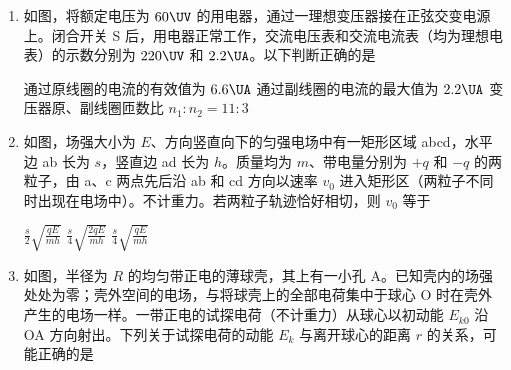 \documentclass[\gkver]{gaokaozhenti}
\begin{document}
\begin{enumerate}

{$F_{N}$ 向左}
{$F_{M}$ 逐渐增大}
{$F_{N}$ 逐渐减小}


\item
如图，将额定电压为 $60\UV$ 的用电器，通过一理想变压器接在正弦交变电源上。闭合开关 S 后，用电器正常工作，交流电压表和交流电流表（均为理想电表）的示数分别为 $220\UV$ 和 $2.2\UA$。以下判断正确的是


{通过原线圈的电流的有效值为 $6.6\UA$}
{通过副线圈的电流的最大值为 $2.2\UA$}
{变压器原、副线圈匝数比 $n_{1}:n_{2}=11:3$}


\item
如图，场强大小为 $E$、方向竖直向下的匀强电场中有一矩形区域 abcd，水平边 ab 长为 $s$，竖直边 ad 长为 $h$。质量均为 $m$、带电量分别为 $+q$ 和 $-q$ 的两粒子，由 a、c 两点先后沿 ab 和 cd 方向以速率 $v_{0}$ 进入矩形区（两粒子不同时出现在电场中）。不计重力。若两粒子轨迹恰好相切，则 $v_{0}$ 等于


{$\frac{s}{2}\sqrt{\frac{qE}{mh}}$}
{$\frac{s}{4}\sqrt{\frac{2qE}{mh}}$}
{$\frac{s}{4}\sqrt{\frac{qE}{mh}}$}


\item
如图，半径为 $R$ 的均匀带正电的薄球壳，其上有一小孔 A。已知壳内的场强处处为零；壳外空间的电场，与将球壳上的全部电荷集中于球心 O 时在壳外产生的电场一样。一带正电的试探电荷（不计重力）从球心以初动能 $E_{k0}$ 沿 OA 方向射出。下列关于试探电荷的动能 $E_{k}$ 与离开球心的距离 $r$ 的关系，可能正确的是


\end{enumerate}
\end{document}
